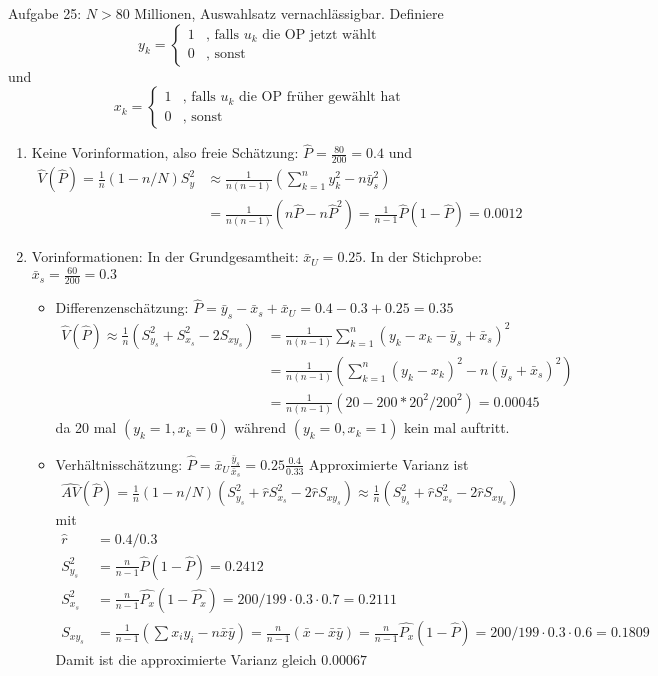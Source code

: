 \begin{Solution}{{Aufgabe 25:}}
$N>80$ Millionen, Auswahlsatz vernachlässigbar. Definiere $$y_k = \begin{cases}
1 &\text{, falls } u_k \text{ die OP jetzt wählt}\\
0 &\text{, sonst}
\end{cases}$$ und $$x_k = \begin{cases}
1 &\text{, falls } u_k \text{ die OP früher gewählt hat}\\
0 &\text{, sonst}
\end{cases}$$
\begin{enumerate}
	\item Keine Vorinformation, also freie Schätzung: $\hat{P} = \frac{80}{200}=0.4$ und
	\begin{align*}
	\hat{V}(\hat{P}) = \frac{1}{n}(1-n/N)S_y^2 &\approx \frac{1}{n(n-1)}\left(\sum_{k=1}^n y_k^2 - n \bar{y}_s^2\right)\\
	&= \frac{1}{n(n-1)}\left(n \hat{P}-n\hat{P}^2\right) = \frac{1}{n-1}\hat{P}(1-\hat{P}) = 0.0012
	\end{align*}
\item Vorinformationen: In der Grundgesamtheit: $\bar{x}_U = 0.25$. In der Stichprobe: $\bar{x}_s = \frac{60}{200} = 0.3$
\begin{itemize}
	\item Differenzenschätzung: $\hat{P} = \bar{y}_s - \bar{x}_s + \bar{x}_U = 0.4-0.3+0.25 = 0.35$
	\begin{align*}
	\hat{V}(\hat{P}) \approx \frac{1}{n}(S_{y_s}^2+S_{x_s}^2-2S_{xy_s}) &= \frac{1}{n(n-1)}\sum_{k=1}^n\left(y_k - x_k - \bar{y}_s + \bar{x}_s\right)^2\\
	&= \frac{1}{n(n-1)}\left(\sum_{k=1}^n (y_k-x_k)^2 - n (\bar{y}_s+\bar{x}_s)^2\right)\\
	&= \frac{1}{n(n-1)}\left(20 - 200*20^2/200^2\right) = 0.00045
	\end{align*}
	da 20 mal $(y_k=1,x_k=0)$ während $(y_k=0,x_k=1)$ kein mal auftritt.
	\item Verhältnisschätzung: $\hat{P}=\bar{x}_U \frac{\bar{y}_s}{\bar{x}_s} = 0.25 \frac{0.4}{0.33}$ Approximierte Varianz ist
	\begin{align*}
	\hat{AV}(\hat{P}) = \frac{1}{n}(1-n/N)\left(S_{y_s}^2+\hat{r}S_{x_s}^2 - 2 \hat{r}S_{xy_s}\right) \approx \frac{1}{n}\left(S_{y_s}^2+\hat{r}S_{x_s}^2 - 2 \hat{r}S_{xy_s}\right)
	\end{align*}
	mit
	\begin{align*}
	\hat{r} &= 0.4/0.3\\
	S_{y_s}^2 &= \frac{n}{n-1}\hat{P}(1-\hat{P}) = 0.2412\\
	S_{x_s}^2 &= \frac{n}{n-1}\hat{P_x}(1-\hat{P_x}) = 200/199 \cdot 0.3 \cdot 0.7 = 0.2111\\
	S_{xy_s} &= \frac{1}{n-1}(\sum x_i y_i - n \bar{x}\bar{y}) = \frac{n}{n-1}(\bar{x}-\bar{x}\bar{y})=\frac{n}{n-1}\hat{P_x}(1-\hat{P}) = 200/199 \cdot 0.3 \cdot 0.6 = 0.1809
	\end{align*}
	Damit ist die approximierte Varianz gleich $0.00067$
\end{itemize}
\end{enumerate}
\end{Solution}
